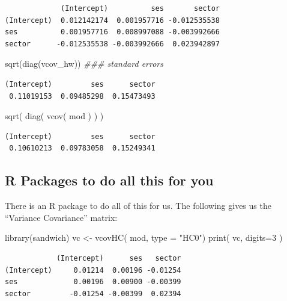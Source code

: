 \documentclass[
  letterpaper,
  DIV=11,
  numbers=noendperiod]{scrreprt}
\newenvironment{Shaded}{}{}
\newcommand{\AttributeTok}[1]{\textcolor[rgb]{0.49,0.56,0.16}{#1}}
\newcommand{\DecValTok}[1]{\textcolor[rgb]{0.25,0.63,0.44}{#1}}
\newcommand{\DocumentationTok}[1]{\textcolor[rgb]{0.73,0.13,0.13}{\textit{#1}}}
\newcommand{\FunctionTok}[1]{\textcolor[rgb]{0.02,0.16,0.49}{#1}}
\newcommand{\NormalTok}[1]{#1}
\newcommand{\OtherTok}[1]{\textcolor[rgb]{0.00,0.44,0.13}{#1}}
\newcommand{\StringTok}[1]{\textcolor[rgb]{0.25,0.44,0.63}{#1}}
\begin{document}
\begin{verbatim}
             (Intercept)          ses       sector
(Intercept)  0.012142174  0.001957716 -0.012535538
ses          0.001957716  0.008997088 -0.003992666
sector      -0.012535538 -0.003992666  0.023942897
\end{verbatim}

\begin{Shaded}
\begin{Highlighting}[]
\FunctionTok{sqrt}\NormalTok{(}\FunctionTok{diag}\NormalTok{(vcov\_hw)) }\DocumentationTok{\#\#\# standard errors}
\end{Highlighting}
\end{Shaded}

\begin{verbatim}
(Intercept)         ses      sector 
 0.11019153  0.09485298  0.15473493 
\end{verbatim}

\begin{Shaded}
\begin{Highlighting}[]
\FunctionTok{sqrt}\NormalTok{( }\FunctionTok{diag}\NormalTok{( }\FunctionTok{vcov}\NormalTok{( mod ) ) )}
\end{Highlighting}
\end{Shaded}

\begin{verbatim}
(Intercept)         ses      sector 
 0.10610213  0.09783058  0.15249341 
\end{verbatim}

\subsection{R Packages to do all this for
you}\label{r-packages-to-do-all-this-for-you}

There is an R package to do all of this for us. The following gives us
the ``Variance Covariance'' matrix:

\begin{Shaded}
\begin{Highlighting}[]
\FunctionTok{library}\NormalTok{(sandwich)}
\NormalTok{vc }\OtherTok{\textless{}{-}} \FunctionTok{vcovHC}\NormalTok{( mod, }\AttributeTok{type =} \StringTok{"HC0"}\NormalTok{)}
\FunctionTok{print}\NormalTok{( vc, }\AttributeTok{digits=}\DecValTok{3}\NormalTok{ )}
\end{Highlighting}
\end{Shaded}

\begin{verbatim}
            (Intercept)      ses   sector
(Intercept)     0.01214  0.00196 -0.01254
ses             0.00196  0.00900 -0.00399
sector         -0.01254 -0.00399  0.02394
\end{verbatim}
\end{document}
